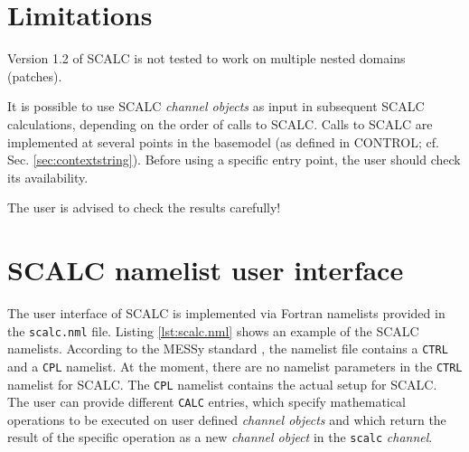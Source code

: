 \documentclass[twoside]{article}
\begin{document}
\section{Limitations}
%
Version 1.2 of SCALC is not tested to work on multiple nested domains (patches).

It is possible to use SCALC {\it channel objects} as input in subsequent SCALC calculations, depending on the order of calls to SCALC.
Calls to SCALC are implemented at several points in the basemodel (as defined in CONTROL; cf. Sec. \ref{sec:contextstring}).
Before using a specific entry point, the user should check its availability.

The user is advised to check the results carefully!

\section{SCALC namelist user interface}
\label{sec:scalcui}
The user interface of SCALC is implemented via Fortran namelists provided in the {\tt scalc.nml} file.
Listing \ref{lst:scalc.nml} shows an example of the SCALC namelists.
According to the MESSy standard \citep{Jockel2005,Jockel2010}, the namelist file contains a {\tt CTRL} and a {\tt CPL} namelist.
At the moment, there are no namelist parameters in the {\tt CTRL} namelist for SCALC.
The {\tt CPL} namelist contains the actual setup for SCALC.
The user can provide different {\tt CALC} entries, which specify mathematical operations to be executed on user defined {\it channel objects} and which return the result of the specific operation as a new {\it channel object} in the {\tt scalc} {\it channel}.
\end{document}

